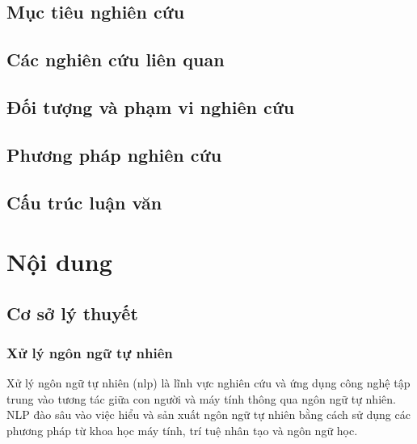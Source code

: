 \documentclass[a4paper, 12pt, openany]{book}
\begin{document}
\section{Mục tiêu nghiên cứu}

\section{Các nghiên cứu liên quan}

\section{Đối tượng và phạm vi nghiên cứu}

\section{Phương pháp nghiên cứu}

\section{Cấu trúc luận văn}


\chapter{Nội dung}

\section{Cơ sở lý thuyết}
\subsection{Xử lý ngôn ngữ tự nhiên}
Xử lý ngôn ngữ tự nhiên (\ac{nlp}) là lĩnh vực nghiên cứu và ứng dụng công nghệ tập trung vào tương tác giữa con người và máy tính thông qua ngôn ngữ tự nhiên. NLP đào sâu vào việc hiểu và sản xuất ngôn ngữ tự nhiên bằng cách sử dụng các phương pháp từ khoa học máy tính, trí tuệ nhân tạo và ngôn ngữ học.
\end{document}
